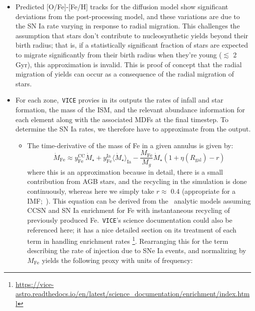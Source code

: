 \documentclass[a4paper, fleqn, usenatbib, useAMS]{mnras}
\begin{document}
\begin{itemize} 
	\item Predicted [O/Fe]-[Fe/H] tracks for the diffusion model show 
	significant deviations from the post-processing model, and these 
	variations are due to the SN Ia rate varying in response to radial 
	migration. This challenges the assumption that stars don't contribute to 
	nucleosynthetic yields beyond their birth radius; that is, if a 
	statistically significant fraction of stars are expected to migrate 
	significantly from their birth radius when they're young ($\lesssim$ 2 
	Gyr), this approximation is invalid. This is proof of concept that the 
	radial migration of yields can occur as a consequence of the radial 
	migration of stars. 

	\item For each zone,~\texttt{VICE} provies in its outputs the rates of 
	infall and star formation, the mass of the ISM, and the relevant 
	abundance information for each element along with the associated 
	MDFs at the final timestep. To determine the SN Ia rates, we therefore 
	have to approximate from the output. 
	\begin{itemize} 
		\item The time-derivative of the mass of Fe in a given annulus is 
		given by: 
		\begin{equation}
		\dot{M}_\text{Fe} \approx y_\text{Fe}^\text{CC}\dot{M}_\star + 
		y_\text{Fe}^\text{Ia}\langle\dot{M}_\star\rangle_\text{Ia} - 
		\frac{M_\text{Fe}}{M_g}\dot{M}_\star(1 + \eta(R_\text{gal}) - r) 
		\end{equation} 
		where this is an approximation because in detail, there is a small 
		contribution from AGB stars, and the recycling in the simulation is 
		done continuously, whereas here we simply take $r \approx$ 0.4 
		(appropriate for a~ IMF;~\citealp{Weinberg2017}). 
		This equation can be derived from the~\citet{Weinberg2017} analytic 
		models assuming CCSN and SN Ia enrichment for Fe with instantaneous 
		recycling of previously produced Fe.~\texttt{VICE}'s science 
		documentation could also be referenced here; it has a nice detailed 
		section on its treatment of each term in handling enrichment rates 
		\footnote{
			\url{https://vice-astro.readthedocs.io/en/latest/science_documentation/enrichment/index.html}
		}. 
		Rearranging this for the term describing the rate of injection due to 
		SNe Ia events, and normalizing by $M_\text{Fe}$ yields the following 
		proxy with units of frequency: 
		\begin{equation} 

\end{equation}
\end{itemize}
\end{itemize}
\end{document}
